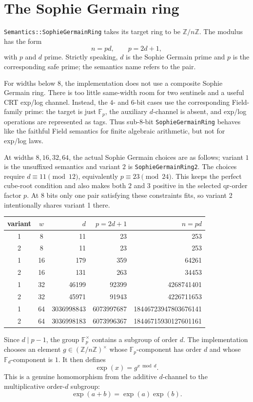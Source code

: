 \documentclass[11pt]{article}
\newcommand{\Z}{\mathbb{Z}}
\newcommand{\F}{\mathbb{F}}
\theoremstyle{plain}
\begin{document}
\section{The Sophie Germain ring}

\texttt{Semantics::SophieGermainRing} takes its target ring to be
\(\Z/n\Z\).  The modulus has the form
\[
  n=pd,\qquad p=2d+1,
\]
with \(p\) and \(d\) prime.  Strictly speaking, \(d\) is the Sophie Germain
prime and \(p\) is the corresponding safe prime; the semantics name refers to
the pair.

For widths below \(8\), the implementation does not use a composite Sophie
Germain ring.  There is too little same-width room for two sentinels and a useful
CRT exp/log channel.  Instead, the \(4\)- and \(6\)-bit cases use the
corresponding Field-family prime: the target is just \(\F_p\), the auxiliary
\(d\)-channel is absent, and exp/log operations are represented as tags.  Thus
sub-\(8\)-bit \texttt{SophieGermainRing} behaves like the faithful Field
semantics for finite algebraic arithmetic, but not for exp/log laws.

At widths \(8,16,32,64\), the actual Sophie Germain choices are as follows;
variant \(1\) is the unsuffixed semantics and variant \(2\) is
\texttt{SophieGermainRing2}.  The choices require \(d\equiv11\pmod {12}\),
equivalently \(p\equiv23\pmod {24}\).  This keeps the perfect cube-root
condition and also makes both \(2\) and \(3\) positive in the selected qr-order
factor \(p\).  At 8 bits only one pair satisfying these constraints fits, so
variant 2 intentionally shares variant 1 there.
\begin{center}
\small
\begin{tabular}{c|c|r|r|r}
variant & \(w\) & \(d\) & \(p=2d+1\) & \(n=pd\)\\
\hline
1 & 8  & 11 & 23 & 253\\
2 & 8  & 11 & 23 & 253\\
1 & 16 & 179 & 359 & 64261\\
2 & 16 & 131 & 263 & 34453\\
1 & 32 & 46199 & 92399 & 4268741401\\
2 & 32 & 45971 & 91943 & 4226711653\\
1 & 64 & 3036998843 & 6073997687 & 18446723947803676141\\
2 & 64 & 3036998183 & 6073996367 & 18446715930127601161
\end{tabular}
\end{center}

Since \(d\mid p-1\), the group \(\F_p^\times\) contains a subgroup of order
\(d\).  The implementation chooses an element \(g\in(\Z/n\Z)^\times\) whose
\(\F_p\)-component has order \(d\) and whose \(\F_d\)-component is \(1\).  It
then defines
\[
  \exp(x)=g^{x\bmod d}.
\]
This is a genuine homomorphism from the additive \(d\)-channel to the
multiplicative order-\(d\) subgroup:
\[
  \exp(a+b)=\exp(a)\exp(b).
\]
\end{document}
